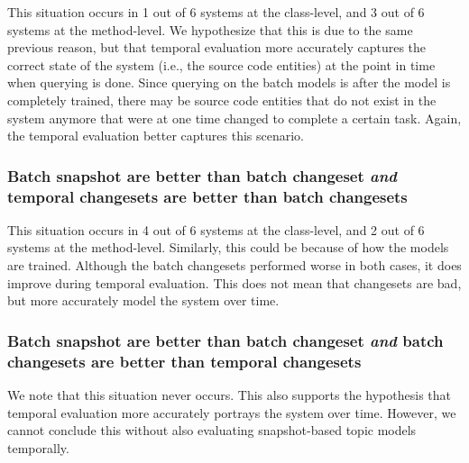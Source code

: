 %

This situation occurs in
1 out of 6 systems at the class-level, and
3 out of 6 systems at the method-level.
We hypothesize that this is due to the same previous reason, but that
temporal evaluation more accurately captures the correct state of the system (i.e., the source code entities)
at the point in time when querying is done.
Since querying on the batch models is after the model is completely trained,
there may be source code entities that do not exist in the system anymore
that were at one time changed to complete a certain task.
Again, the temporal evaluation better captures this scenario.

\subsubsection{Batch snapshot are better than batch changeset
\emph{and} temporal changesets are better than batch changesets}

%

This situation occurs in
4 out of 6 systems at the class-level, and
2 out of 6 systems at the method-level.
Similarly, this could be because of how the models are trained.
Although the batch changesets performed worse in both cases, it does
improve during temporal evaluation.
This does not mean that changesets are bad, but more accurately model
the system over time.

\subsubsection{Batch snapshot are better than batch changeset
\emph{and} batch changesets are better than temporal changesets}

%
%
We note that this situation never occurs.
This also supports the hypothesis that temporal evaluation more accurately portrays the system over time.
However, we cannot conclude this without also evaluating snapshot-based topic models temporally.
